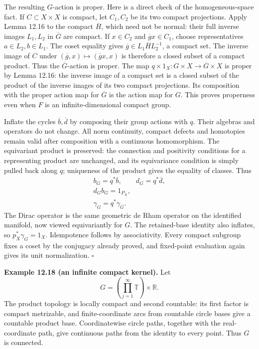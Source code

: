\documentclass[
  11pt,
]{article}
\begin{document}
The resulting \(G\)-action is proper. Here is a direct check of the
homogeneous-space fact. If \(C\subset X\times X\) is compact, let
\(C_1,C_2\) be its two compact projections. Apply Lemma 12.16 to the
compact \(\overline H\), which need not be normal: their full inverse
images \(L_1,L_2\) in \(\overline G\) are compact. If \(x\in C_2\) and
\(\overline g x\in C_1\), choose representatives \(a\in L_2,b\in L_1\).
The coset equality gives \(\overline g\in L_1\overline H L_2^{-1}\), a
compact set. The inverse image of \(C\) under
\((\overline g,x)\mapsto(\overline g x,x)\) is therefore a closed subset
of a compact product. Thus the \(\overline G\)-action is proper. The map
\(q\times1_X:G\times X\to\overline G\times X\) is proper by Lemma 12.16:
the inverse image of a compact set is a closed subset of the product of
the inverse images of its two compact projections. Its composition with
the proper action map for \(\overline G\) is the action map for \(G\).
This proves properness even when \(F\) is an infinite-dimensional
compact group.

Inflate the cycles \(\overline b,\overline d\) by composing their group
actions with \(q\). Their algebras and operators do not change. All norm
continuity, compact defects and homotopies remain valid after
composition with a continuous homomorphism. The equivariant product is
preserved: the connection and positivity conditions for a representing
product are unchanged, and its equivariance condition is simply pulled
back along \(q\); uniqueness of the product gives the equality of
classes. Thus \[
\begin{gathered}
b_G=q^*\overline b,\qquad d_G=q^*\overline d,\\
d_Gb_G=1_{P_X},\\
\gamma_G=q^*\gamma_{\overline G}.
\end{gathered}
\tag{12.53}
\] The Dirac operator is the same geometric de Rham operator on the
identified manifold, now viewed equivariantly for \(G\). The
retained-base identity also inflates, so \(p_X^*\gamma_G=1_X\).
Idempotence follows by associativity. Every compact subgroup fixes a
coset by the conjugacy already proved, and fixed-point evaluation again
gives its unit normalization. \(\square\)

\textbf{Example 12.18 (an infinite compact kernel).} Let \[
G=\left(\prod_{j=1}^{\infty}\mathbb T\right)\times\mathbb R.
\tag{12.54}
\] The product topology is locally compact and second countable: its
first factor is compact metrizable, and finite-coordinate arcs from
countable circle bases give a countable product base. Coordinatewise
circle paths, together with the real-coordinate path, give continuous
paths from the identity to every point. Thus \(G\) is connected.
\end{document}
